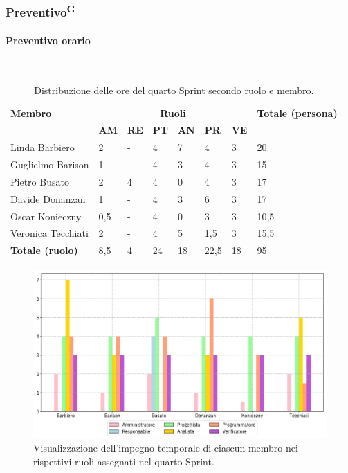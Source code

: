 \documentclass[8pt]{article}
\newcommand{\glossterm}[1]{#1\textsuperscript{G}} %
\newcommand{\subsubsubsection}[1]{\paragraph{#1}\mbox{}\\}
\begin{document}
\subsubsection{\glossterm{Preventivo}}
\subsubsubsection{Preventivo orario}
\begin{table}[ht!]
	\centering
	\begin{tabular}{p{4cm} p{1cm} p{1cm} p{1cm} p{1cm} p{1cm} p{1cm} p{3cm}}
		\toprule
        \textbf{Membro} & \multicolumn{6}{c}{\textbf{Ruoli}} & \textbf{Totale (persona)}\\
		& \textbf{AM} & \textbf{RE} & \textbf{PT} & \textbf{AN} & \textbf{PR} & \textbf{VE}\\
		\midrule
        Linda Barbiero          & 2     & -     & 4     & 7     & 4     & 3     & 20 \\
        Guglielmo Barison       & 1     & -     & 4     & 3     & 4     & 3     & 15\\
        Pietro Busato           & 2     & 4     & 4     & 0     & 4     & 3     & 17 \\
        Davide Donanzan         & 1     & -     & 4     & 3     & 6     & 3     & 17 \\
        Oscar Konieczny         & 0,5     & -     & 4     & 0     & 3     & 3     & 10,5 \\
        Veronica Tecchiati      & 2     & -     & 4     & 5     & 1,5   & 3     & 15,5 \\
        \bottomrule
        \textbf{Totale (ruolo)} & 8,5    & 4     & 24    & 18    & 22,5  & 18   & 95 \\
	\end{tabular}
	\caption{Distribuzione delle ore del quarto Sprint secondo ruolo e membro.}
	\label{table:Distribuzione delle ore del quarto Sprint secondo ruolo e membro}
\end{table}
\begin{figure}[ht!]
    \centering
    \includegraphics[width=15cm]{./images_pdp/istogramma_periodo_4.png}
    \caption{Visualizzazione dell’impegno temporale di ciascun membro nei rispettivi ruoli assegnati
    nel quarto Sprint.}
    \label{figure:Visualizzazione dell’impegno temporale di ciascun membro nei rispettivi ruoli
    assegnati nel quarto Sprint}
\end{figure}
\end{document}
